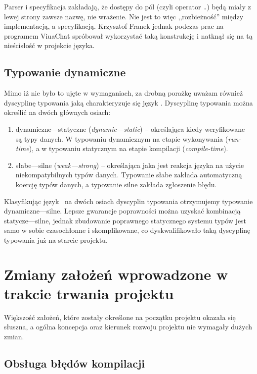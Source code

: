 Parser i specyfikacja zakładają, że dostępy do pól (czyli operator \texttt{.})
będą miały z lewej strony zawsze nazwę, nie wrażenie. Nie jest to więc
,,rozbieżność'' między implementacją, a specyfikacją. Krzysztof Franek jednak
podczas prac na programem ViuaChat spróbował wykorzystać taką konstrukcję i
natknął się na tą nieścisłość w projekcie języka.

\subsection{Typowanie dynamiczne}

Mimo iż nie było to ujęte w wymaganiach, za drobną porażkę uważam również
dyscyplinę typowania jaką charakteryzuje się język \ViuAct. Dyscyplinę typowania
można określić na dwóch głównych osiach:
\begin{enumerate}
\item dynamiczne---statyczne (\emph{dynamic---static}) -- określająca kiedy
    weryfikowane są typy danych. W typowaniu dynamicznym na etapie wykonywania
    (\emph{run-time}), a w typowaniu statycznym na etapie kompilacji
    (\emph{compile-time}).
\item słabe---silne (\emph{weak---strong}) -- określająca jaka jest reakcja
    języka na użycie niekompatybilnych typów danych. Typowanie słabe zakłada
    automatyczną koercję typów danych, a typowanie silne zakłada zgłoszenie
    błędu.
\end{enumerate}

Klasyfikując język \ViuAct\ na dwóch osiach dyscyplin typowania
otrzymujemy typowanie dynamiczne---silne. Lepsze gwarancje poprawności można
uzyskać kombinacją statycze---silne, jednak zbudowanie poprawnego statycznego
systemu typów jest samo w sobie czasochłonne i skomplikowane, co
dyskwalifikowało taką dyscyplinę typowania już na starcie projektu.

\section{Zmiany założeń wprowadzone w trakcie trwania projektu}

Większość założeń, które zostały określone na początku projektu okazała się
słuszna, a ogólna koncepcja oraz kierunek rozwoju projektu nie wymagały dużych
zmian.

\subsection{Obsługa błędów kompilacji}

